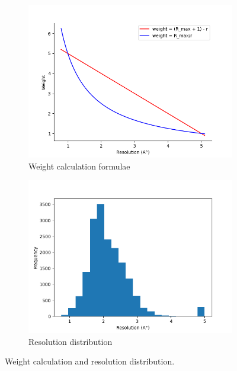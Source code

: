 \documentclass[11pt]{article}
\begin{document}
\begin{figure}
     \centering
     \begin{subfigure}[b]{0.45\textwidth}
         \centering
    \includegraphics[scale=0.5]{images/graphingformula}
    \caption{Weight calculation formulae}
    \label{fig:graphingformula}
     \end{subfigure}
     \hfill
     \begin{subfigure}[b]{0.45\textwidth}
         \centering
        \includegraphics[scale=0.5]{images/resolutiondistribution}
        \caption{Resolution distribution}
        \label{fig:resolutiondistribution}
     \end{subfigure}
     \caption{Weight calculation and resolution distribution.}
     \label{fig:ResolutionWeightStats}
\end{figure}
\end{document}
